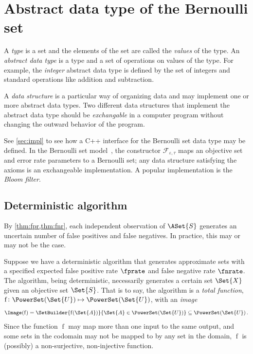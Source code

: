 \documentclass[ ../main.tex]{subfiles}
\begin{document}
\section{Abstract data type of the Bernoulli set}
\label{sec:adt}
A \emph{type} is a set and the elements of the set are called the \emph{values} 
of the type. An \emph{abstract data type} is a type and a set of operations on 
values of the type. For example, the \emph{integer} abstract data type is 
defined by the set of integers and standard operations like addition and 
subtraction.

A \emph{data structure} is a particular way of organizing data and may 
implement one or more abstract data types. Two different data structures that 
implement the abstract data type should be \emph{exchangable} in a computer 
program without changing the outward behavior of the program.

See \cref{sec:impl} to see how a C++ interface for the Bernoulli set
data type may be defined. In the Bernoulli set model~\cite{bsets}, the
constructor $\mathcal{F}_{\varepsilon,\tau}$ maps an objective set and error
rate parameters to a Bernoulli set; any data structure satisfying the axioms is
an exchangeable implementation. A popular implementation is the \emph{Bloom
filter}.

\subsection{Deterministic algorithm}
By \cref{thm:fpr,thm:fnr}, each independent observation of $\ASet{S}$ generates 
an uncertain number of false positives and false negatives. In practice, this
may or may not be the case.

Suppose we have a deterministic algorithm that generates approximate sets with 
a specified expected false positive rate $\fprate$ and false negative rate 
$\fnrate$. The algorithm, being deterministic, necessarily generates a certain 
set $\Set{X}$ given an objective set $\Set{S}$. That is to say, the algorithm 
is a \emph{total function},
	$\operatorname{f} \colon \PowerSet(\Set{U}) \mapsto \PowerSet(\Set{U})$,
with an \emph{image}
\begin{equation}
\Image(\operatorname{f}) = 
    \SetBuilder{\operatorname{f}(\Set{A})}{\Set{A} \in \PowerSet(\Set{U})}
        \subseteq \PowerSet(\Set{U})\,.
\end{equation}
Since the function $\operatorname{f}$ may map more than one input to the same 
output, and some sets in the codomain may not be mapped to by any set in the 
domain, $\operatorname{f}$ is (possibly) a non-surjective, non-injective 
function.
\end{document}
